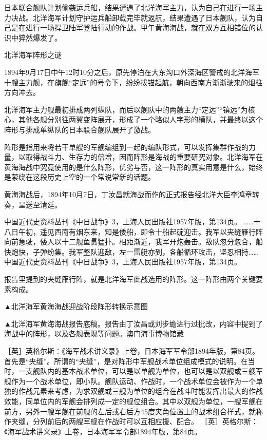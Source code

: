 \documentclass[12pt,UTF8]{ctexbook}
\begin{document}
日本联合舰队计划偷袭运兵船，结果遭遇了北洋海军主力，认为自己在进行一场主力决战。北洋海军计划守护运兵船卸载完毕就返航，结果遭遇了日本舰队，认为自己是在进行一场捍卫陆军登陆行动的作战。甲午黄海海战，就在双方互相错位的认识中猝然爆发了。

北洋海军阵形之谜

1894年9月17日中午12时10分之后，原先停泊在大东沟口外深海区警戒的北洋海军十艘主力舰，在旗舰“定远”的号令下，纷纷拔锚起航，朝向西南方渐渐驶来的烟柱方向冲去。

北洋海军主力舰最初排成两列纵队，而后以舰队中的两艘主力“定远”“镇远”为核心，其他各舰分别往两翼变阵展开，形成了一个略似人字形的横队，并最终以这个阵形与排成单纵队的日本联合舰队展开了激战。

阵形是指用来将若干单艘的军舰编组到一起的编队形式，可以发挥集群作战的力量，以取得战斗力、生存力的倍增，因而阵形是海战的重要研究对象。北洋海军在黄海海战中究竟使用的是什么阵形，优劣与否，这一阵形的真实用意是什么，始终是萦绕在这段历史上空的一个常说常新的话题。

黄海海战后，1894年10月7日，丁汝昌就海战而作的正式报告经北洋大臣李鸿章转奏，呈送至清廷。

中国近代史资料丛刊《中日战争》3，上海人民出版社1957年版，第134页。
……十八日午初，遥见西南有烟东来，知是倭船，即令十船起碇迎击。我军以夹缝雁行阵向前急驶，倭人以十二舰鱼贯猛扑。相距渐近，我军开炮轰击。敌队忽分忽合，船快炮快，子弹纷集。我军整队迎敌，左一雷艇亦到，各船循环攻击，坚忍相持…… 中国近代史资料丛刊《中日战争》3，上海人民出版社1957年版，第134页。

报告里提到的夹缝雁行阵，就是北洋海军此战选用的阵形。这一阵形由两个关键要素构成。


▲北洋海军黄海海战迎战阶段阵形转换示意图


▲北洋海军黄海海战报告底稿。报告由丁汝昌或刘步蟾进行过批改，内容中提到了海战中的阵形，以及各舰表现等问题。澳门海事博物馆藏

［英］英格尔斯：《海军战术讲义录》上卷，日本海军军令部1894年版，第84页。
首先是“夹缝”。所谓的“夹缝”，是对阵形中军舰战术单位组成模式的说明。在当时，一支舰队内的基本战术单位，可以是以单舰为单位，也可以是以双舰或三艘军舰作为一个战术单位，即小队。舰队运动、作战时，一个战术单位会被作为一个单独的作战元素来考虑，为求双舰或三舰为单位的组合在战斗时能发挥出最大的作战效能，同单位内的军舰会排列成一定的舰位组合。其中以双舰为单位，一艘军舰在前方，另外一艘军舰在前舰的左后或右后方45度夹角位置上的战术组合样式，就称作夹缝，分列前后的两艘军舰在作战时可以互相应援、配合。 ［英］英格尔斯：《海军战术讲义录》上卷，日本海军军令部1894年版，第84页。
\end{document}
